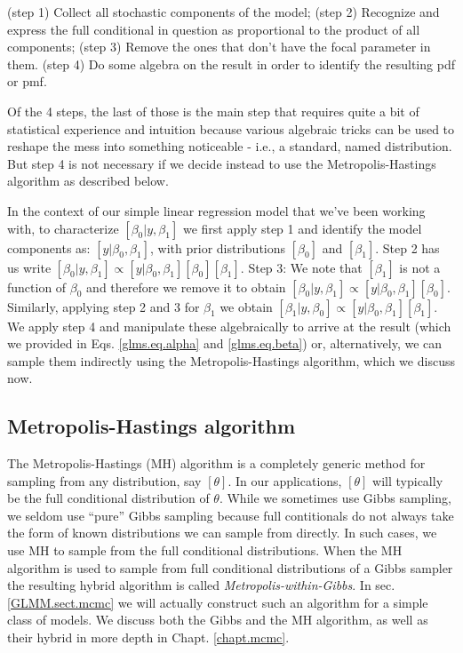 {\flushleft (step 1)} Collect all stochastic components of the model;
{\flushleft (step 2)} Recognize and express the full conditional in question
  as proportional to the product of all components;
{\flushleft (step 3)} Remove the ones that don't have the focal parameter in them.
{\flushleft (step 4)} Do some algebra on the result in order to identify the resulting pdf or pmf.

Of the 4 steps, the last of those is the main step that requires quite
a bit of statistical experience and intuition because various
algebraic tricks can be used to reshape the mess into something
noticeable - i.e., a standard, named distribution. But step 4 is not
necessary if we decide instead to use the Metropolis-Hastings algorithm
as described below.

In the context of our simple linear regression model that we've been 
working with, to characterize $[\beta_0|y,\beta_1]$ we first apply step 1
and identify the model components as: $[y|\beta_0, \beta_1]$, with
prior distributions $[\beta_0]$
and $[\beta_1]$. Step 2 has us write $[\beta_0|y,\beta_1] \propto
[y|\beta_0,\beta_1][\beta_0][\beta_1]$.  Step 3: We note that $[\beta_1]$ is not a
function of $\beta_0$ and therefore we remove it to obtain $[\beta_0|y,\beta_1]
\propto [y|\beta_0,\beta_1][\beta_0]$. Similarly, applying step 2 and 3 for $\beta_1$ we obtain $[\beta_1|y,\beta_0]
\propto [y|\beta_0,\beta_1][\beta_1]$. We apply step 4 and manipulate
these algebraically to arrive at the result (which we provided in
Eqs. \ref{glms.eq.alpha} and \ref{glms.eq.beta}) or, alternatively, we can
sample them indirectly using the Metropolis-Hastings algorithm, which we 
discuss now.


\subsection{Metropolis-Hastings algorithm}

The Metropolis-Hastings (MH) algorithm is a completely generic method for
sampling from any distribution, say $[\theta]$. In our applications,
$[\theta]$ will typically be the full conditional distribution of
$\theta$.
While we sometimes use Gibbs sampling, we seldom
use ``pure'' Gibbs sampling because full contitionals do not always take the form of known distributions we can sample from directly. In such cases, we use MH to sample from the full conditional distributions.
When the MH algorithm is used to sample from  full
conditional distributions of a Gibbs sampler the resulting hybrid algorithm is
called
 {\it Metropolis-within-Gibbs}.
In sec. \ref{GLMM.sect.mcmc} we will
actually construct such an algorithm for a simple class of models. We discuss both the Gibbs and the MH algorithm, as well as their hybrid in more depth in Chapt. \ref{chapt.mcmc}.


